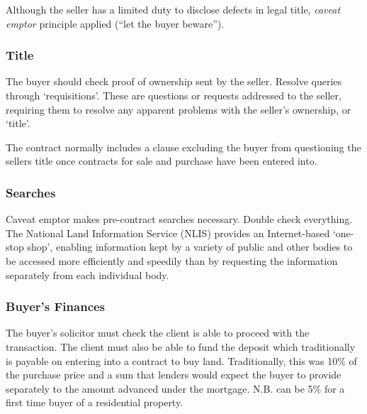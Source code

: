 \documentclass[
]{article}
\newenvironment{Shaded}{}{}
\newcommand{\NormalTok}[1]{#1}
\begin{document}
Although the seller has a limited duty to disclose defects in legal
title, \emph{caveat emptor} principle applied (``let the buyer
beware'').

\hypertarget{title}{%
\subsubsection{Title}\label{title}}

The buyer should check proof of ownership sent by the seller. Resolve
queries through `requisitions'. These are questions or requests
addressed to the seller, requiring them to resolve any apparent problems
with the seller's ownership, or `title'.

\begin{Shaded}
\begin{Highlighting}[]
\NormalTok{The contract normally includes a clause excluding the buyer from questioning the seller\textquotesingle{}s title once contracts for sale and purchase have been entered into. }
\end{Highlighting}
\end{Shaded}

\hypertarget{searches}{%
\subsubsection{Searches}\label{searches}}

Caveat emptor makes pre-contract searches necessary. Double check
everything. The National Land Information Service (NLIS) provides an
Internet-based `one-stop shop', enabling information kept by a variety
of public and other bodies to be accessed more efficiently and speedily
than by requesting the information separately from each individual body.

\hypertarget{buyers-finances}{%
\subsubsection{Buyer's Finances}\label{buyers-finances}}

The buyer's solicitor must check the client is able to proceed with the
transaction. The client must also be able to fund the deposit which
traditionally is payable on entering into a contract to buy land.
Traditionally, this was 10\% of the purchase price and a sum that
lenders would expect the buyer to provide separately to the amount
advanced under the mortgage. N.B. can be 5\% for a first time buyer of a
residential property.
\end{document}

